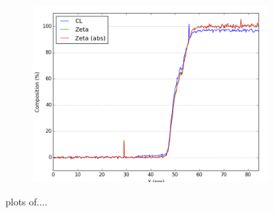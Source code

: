 \begin{figure}
\begin{subfigure}{.45\textwidth}
			\includegraphics[width=\linewidth]{fig/q-new/oldzetas_Sa_Ge_Ka}
			\caption{}
			\label{fig:zeta_area1_ge}
	\end{subfigure}
\hfill
	\caption{plots of....}
	\label{fig:zeta_area1}
\end{figure}

